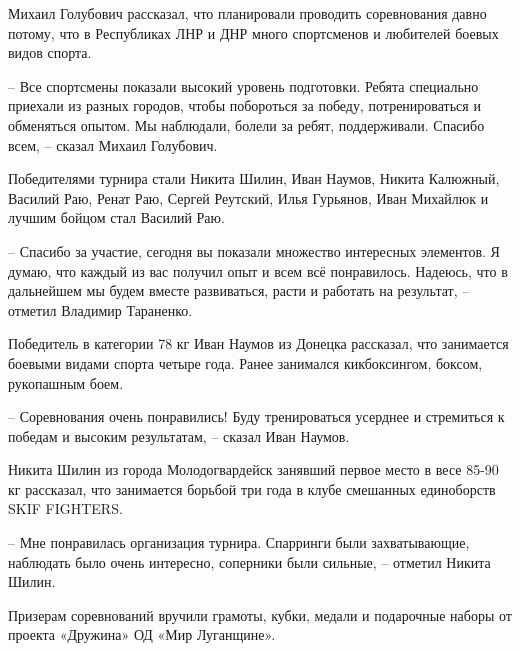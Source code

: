 Михаил Голубович рассказал, что планировали проводить соревнования давно
потому, что в Республиках ЛНР и ДНР много спортсменов и любителей боевых видов
спорта.


– Все спортсмены показали высокий уровень подготовки. Ребята специально
приехали из разных городов, чтобы побороться за победу, потренироваться и
обменяться опытом. Мы наблюдали, болели за ребят, поддерживали. Спасибо всем, –
сказал Михаил Голубович.


Победителями турнира стали Никита Шилин, Иван Наумов,  Никита Калюжный, Василий
Раю, Ренат Раю, Сергей Реутский, Илья Гурьянов, Иван Михайлюк и лучшим бойцом
стал Василий Раю.

– Спасибо за участие, сегодня вы показали множество интересных элементов. Я
думаю, что каждый из вас получил опыт и всем всё понравилось. Надеюсь, что в
дальнейшем мы будем вместе развиваться, расти и работать на результат, –
отметил Владимир Тараненко.

Победитель в категории 78 кг Иван Наумов из Донецка рассказал, что занимается
боевыми видами спорта четыре года. Ранее занимался кикбоксингом, боксом,
рукопашным боем.

– Соревнования очень понравились! Буду тренироваться усерднее и стремиться к
победам и высоким результатам, – сказал Иван Наумов.

Никита Шилин из города Молодогвардейск занявший первое место в весе 85-90 кг
рассказал, что занимается борьбой три года в клубе смешанных единоборств SKIF
FIGHTERS.

– Мне понравилась организация турнира. Спарринги были захватывающие, наблюдать
было очень интересно, соперники были сильные,  – отметил Никита Шилин.

Призерам соревнований вручили грамоты, кубки, медали и подарочные наборы от
проекта «Дружина» ОД «Мир Луганщине».
